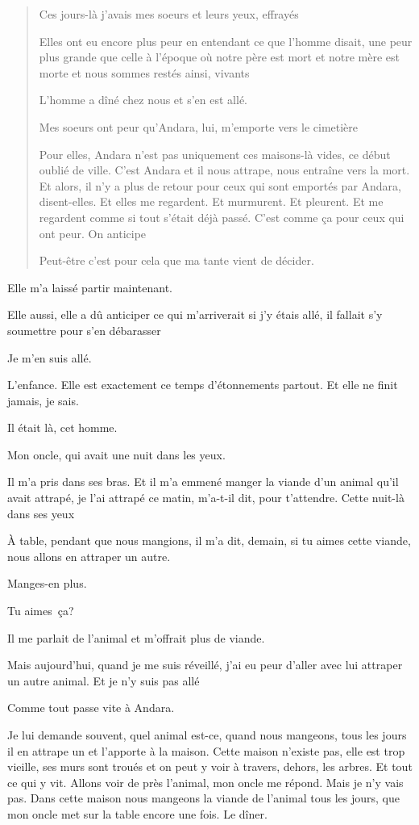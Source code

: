 \begin{quote}
Ces jours-là j'avais mes soeurs et leurs yeux, effrayés

Elles ont eu encore plus peur en entendant ce que l'homme disait, une
peur plus grande que celle à l'époque où notre père est mort et notre
mère est morte et nous sommes restés ainsi, vivants

L'homme a dîné chez nous et s'en est allé.

Mes soeurs ont peur qu'Andara, lui, m'emporte vers le cimetière

Pour elles, Andara n'est pas uniquement ces maisons-là vides, ce début
oublié de ville. C'est Andara et il nous attrape, nous entraîne vers la
mort. Et alors, il n'y a plus de retour pour ceux qui sont emportés par
Andara, disent-elles. Et elles me regardent. Et murmurent. Et pleurent.
Et me regardent comme si tout s'était déjà passé. C'est comme ça pour
ceux qui ont peur. On anticipe

Peut-être c'est pour cela que ma tante vient de décider.
\end{quote}

Elle m'a laissé partir maintenant.

Elle aussi, elle a dû anticiper ce qui m'arriverait si j'y étais allé,
il fallait s'y soumettre pour s'en débarasser

Je m'en suis allé.

L'enfance. Elle est exactement ce temps d'étonnements partout. Et elle
ne finit jamais, je sais.

Il était là, cet homme.

Mon oncle, qui avait une nuit dans les yeux.

Il m'a pris dans ses bras. Et il m'a emmené manger la viande d'un animal
qu'il avait attrapé, je l'ai attrapé ce matin, m'a-t-il dit, pour
t'attendre. Cette nuit-là dans ses yeux

À table, pendant que nous mangions, il m'a dit, demain, si tu aimes
cette viande, nous allons en attraper un autre.

Manges-en plus.

Tu aimes~ça?

Il me parlait de l'animal et m'offrait plus de viande.

Mais aujourd'hui, quand je me suis réveillé, j'ai eu peur d'aller avec
lui attraper un autre animal. Et je n'y suis pas allé

Comme tout passe vite à Andara.

Je lui demande souvent, quel animal est-ce, quand nous mangeons, tous
les jours il en attrape un et l'apporte à la maison. Cette maison
n'existe pas, elle est trop vieille, ses murs sont troués et on peut y
voir à travers, dehors, les arbres. Et tout ce qui y vit. Allons voir de
près l'animal, mon oncle me répond. Mais je n'y vais pas. Dans cette
maison nous mangeons la viande de l'animal tous les jours, que mon oncle
met sur la table encore une fois. Le dîner.

